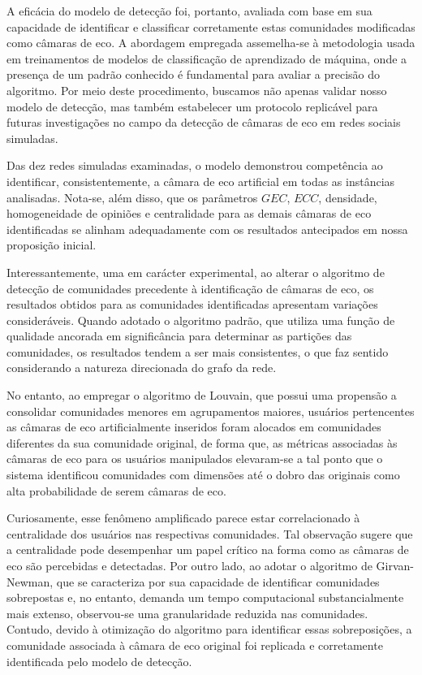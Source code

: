 A eficácia do modelo de detecção foi, portanto, avaliada com base em sua capacidade de identificar e classificar corretamente estas comunidades modificadas como câmaras de eco. A abordagem empregada assemelha-se à metodologia usada em treinamentos de modelos de classificação de aprendizado de máquina, onde a presença de um padrão conhecido é fundamental para avaliar a precisão do algoritmo. Por meio deste procedimento, buscamos não apenas validar nosso modelo de detecção, mas também estabelecer um protocolo replicável para futuras investigações no campo da detecção de câmaras de eco em redes sociais simuladas.

Das dez redes simuladas examinadas, o modelo demonstrou competência ao identificar, consistentemente, a câmara de eco artificial em todas as instâncias analisadas. Nota-se, além disso, que os parâmetros $GEC$, $ECC$, densidade, homogeneidade de opiniões e centralidade para as demais câmaras de eco identificadas se alinham adequadamente com os resultados antecipados em nossa proposição inicial.

Interessantemente, uma em carácter experimental, ao alterar o algoritmo de detecção de comunidades precedente à identificação de câmaras de eco, os resultados obtidos para as comunidades identificadas apresentam variações consideráveis. Quando adotado o algoritmo padrão, que utiliza uma função de qualidade ancorada em significância para determinar as partições das comunidades, os resultados tendem a ser mais consistentes, o que faz sentido considerando a natureza direcionada do grafo da rede.

No entanto, ao empregar o algoritmo de Louvain, que possui uma propensão a consolidar comunidades menores em agrupamentos maiores, usuários pertencentes as câmaras de eco artificialmente inseridos foram alocados em comunidades diferentes da sua comunidade original, de forma que, as métricas associadas às câmaras de eco para os usuários manipulados elevaram-se a tal ponto que o sistema identificou comunidades com dimensões até o dobro das originais como alta probabilidade de serem câmaras de eco.

Curiosamente, esse fenômeno amplificado parece estar correlacionado à centralidade dos usuários nas respectivas comunidades. Tal observação sugere que a centralidade pode desempenhar um papel crítico na forma como as câmaras de eco são percebidas e detectadas. Por outro lado, ao adotar o algoritmo de Girvan-Newman, que se caracteriza por sua capacidade de identificar comunidades sobrepostas e, no entanto, demanda um tempo computacional substancialmente mais extenso, observou-se uma granularidade reduzida nas comunidades. Contudo, devido à otimização do algoritmo para identificar essas sobreposições, a comunidade associada à câmara de eco original foi replicada e corretamente identificada pelo modelo de detecção.

